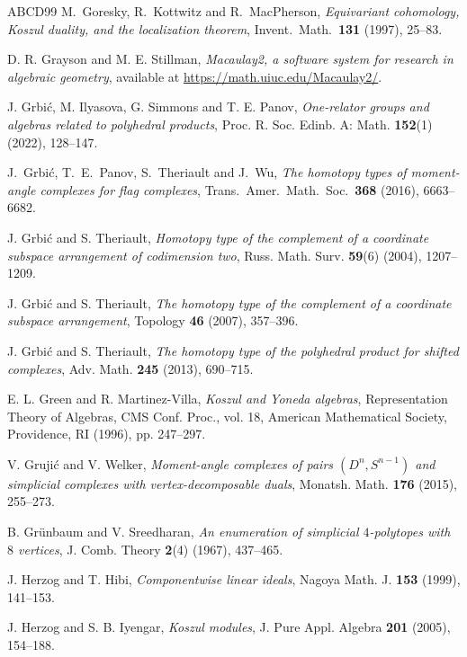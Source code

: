 \documentclass[a4paper,10pt]{amsart}
\theoremstyle{definition}
\theoremstyle{remark}
\begin{document}
\begin{thebibliography}{ABCD99}
 M.\ Goresky, R.\ Kottwitz and R.\ MacPherson, \emph{Equivariant cohomology, Koszul duality, and the localization theorem}, Invent.\ Math.\ \textbf{131} (1997), 25--83.

 D. R. Grayson and M. E. Stillman, \emph{Macaulay2, a software system for research in algebraic geometry}, available at \url{https://math.uiuc.edu/Macaulay2/}.

 J. Grbi\'c, M. Ilyasova, G. Simmons and T. E. Panov, \emph{One-relator groups and algebras related to polyhedral products}, Proc. R. Soc. Edinb. A: Math. \textbf{152}(1) (2022), 128--147.

 J.\ Grbi\'c, T.\ E.\ Panov, S.\ Theriault and J.\ Wu, \emph{The homotopy types of moment-angle complexes for flag complexes}, Trans.\ Amer.\ Math.\ Soc.\ \textbf{368} (2016), 6663--6682.

 J. Grbi\'c and S. Theriault, \emph{Homotopy type of the complement of a coordinate subspace arrangement of codimension two}, Russ. Math. Surv. \textbf{59}(6) (2004), 1207--1209.

 J. Grbi\'c and S. Theriault, \emph{The homotopy type of the complement of a coordinate subspace arrangement}, Topology \textbf{46} (2007), 357--396.

 J. Grbi\'c and S. Theriault, \emph{The homotopy type of the polyhedral product for shifted complexes}, Adv. Math. \textbf{245} (2013), 690--715.

 E. L. Green and R. Martinez-Villa, \emph{Koszul and Yoneda algebras}, Representation Theory of Algebras, CMS Conf. Proc., vol. 18, American Mathematical Society, Providence, RI (1996), pp. 247--297.

 V. Gruji\'c and V. Welker, \emph{Moment-angle complexes of pairs $(D^n,S^{n-1})$ and simplicial complexes with vertex-decomposable duals}, Monatsh. Math. \textbf{176} (2015), 255--273.

 B. Gr\"unbaum and V. Sreedharan, \emph{An enumeration of simplicial $4$-polytopes with $8$ vertices}, J. Comb. Theory \textbf{2}(4) (1967), 437--465.

 J. Herzog and T. Hibi, \emph{Componentwise linear ideals}, Nagoya Math. J. \textbf{153} (1999), 141--153.

 J. Herzog and S. B. Iyengar, \emph{Koszul modules}, J. Pure Appl. Algebra \textbf{201} (2005), 154--188.


\end{thebibliography}
\end{document}
